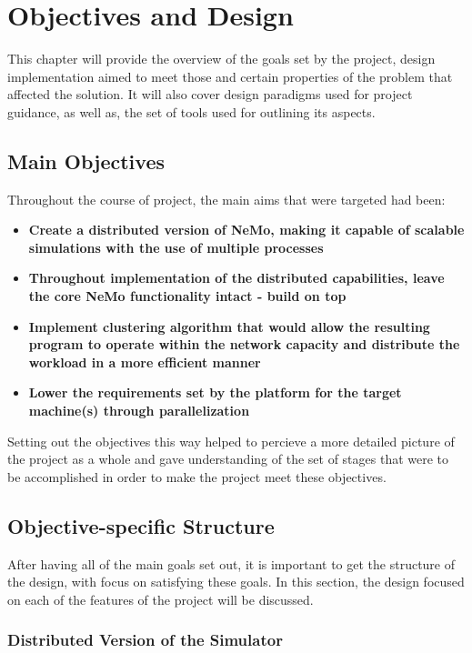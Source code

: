 \chapter{Objectives and Design}

This chapter will provide the overview of the goals set by the project, design implementation aimed to meet those and certain properties of the problem that affected the solution.
It will also cover design paradigms used for project guidance, as well as, the set of tools used for outlining its aspects.

\section{Main Objectives}

Throughout the course of project, the main aims that were targeted had been:

\begin{itemize}
\item {\textbf{Create a distributed version of NeMo, making it capable of scalable simulations with the use of multiple processes}}
\item {\textbf{Throughout implementation of the distributed capabilities, leave the core NeMo functionality intact - build on top}}
\item {\textbf{Implement clustering algorithm that would allow the resulting program to operate within the network capacity and distribute the workload in a more efficient manner}}
\item {\textbf{Lower the requirements set by the platform for the target machine(s) through parallelization}}
\end{itemize}

Setting out the objectives this way helped to percieve a more detailed picture of the project as a whole and gave understanding of the set of stages that were to be accomplished in order to
make the project meet these objectives.

\section{Objective-specific Structure}

After having all of the main goals set out, it is important to get the structure of the design, with focus on satisfying these goals. In this section, the design focused on each of the features of the project will be discussed.

\subsection{Distributed Version of the Simulator}


